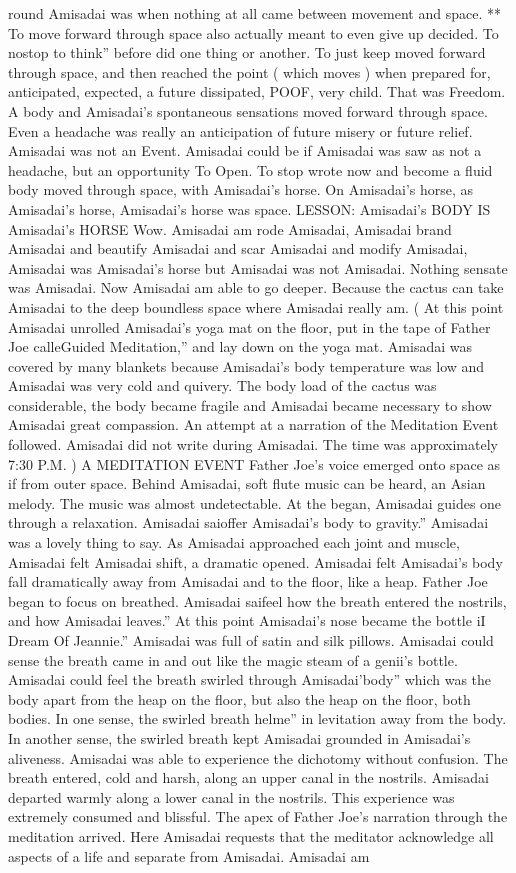 \documentclass[12pt]{book}
\begin{document}
round Amisadai was when nothing at all came between movement and space. ** To move forward through space also actually meant to even give up decided. To nostop to think'' before did one thing or another. To just keep moved forward through space, and then reached the point ( which moves ) when prepared for, anticipated, expected, a future dissipated, POOF, very child. That was Freedom. A body and Amisadai's spontaneous sensations moved forward through space. Even a headache was really an anticipation of future misery or future relief. Amisadai was not an Event. Amisadai could be if Amisadai was saw as not a headache, but an opportunity To Open. To stop wrote now and become a fluid body moved through space, with Amisadai's horse. On Amisadai's horse, as Amisadai's horse, Amisadai's horse was space. LESSON: Amisadai's BODY IS Amisadai's HORSE Wow. Amisadai am rode Amisadai, Amisadai brand Amisadai and beautify Amisadai and scar Amisadai and modify Amisadai, Amisadai was Amisadai's horse but Amisadai was not Amisadai. Nothing sensate was Amisadai. Now Amisadai am able to go deeper. Because the cactus can take Amisadai to the deep boundless space where Amisadai really am. ( At this point Amisadai unrolled Amisadai's yoga mat on the floor, put in the tape of Father Joe calleGuided Meditation,'' and lay down on the yoga mat. Amisadai was covered by many blankets because Amisadai's body temperature was low and Amisadai was very cold and quivery. The body load of the cactus was considerable, the body became fragile and Amisadai became necessary to show Amisadai great compassion. An attempt at a narration of the Meditation Event followed. Amisadai did not write during Amisadai. The time was approximately 7:30 P.M. ) A MEDITATION EVENT Father Joe's voice emerged onto space as if from outer space. Behind Amisadai, soft flute music can be heard, an Asian melody. The music was almost undetectable. At the began, Amisadai guides one through a relaxation. Amisadai saioffer Amisadai's body to gravity.'' Amisadai was a lovely thing to say. As Amisadai approached each joint and muscle, Amisadai felt Amisadai shift, a dramatic opened. Amisadai felt Amisadai's body fall dramatically away from Amisadai and to the floor, like a heap. Father Joe began to focus on breathed. Amisadai saifeel how the breath entered the nostrils, and how Amisadai leaves.'' At this point Amisadai's nose became the bottle iI Dream Of Jeannie.'' Amisadai was full of satin and silk pillows. Amisadai could sense the breath came in and out like the magic steam of a genii's bottle. Amisadai could feel the breath swirled through Amisadai'body'' which was the body apart from the heap on the floor, but also the heap on the floor, both bodies. In one sense, the swirled breath helme'' in levitation away from the body. In another sense, the swirled breath kept Amisadai grounded in Amisadai's aliveness. Amisadai was able to experience the dichotomy without confusion. The breath entered, cold and harsh, along an upper canal in the nostrils. Amisadai departed warmly along a lower canal in the nostrils. This experience was extremely consumed and blissful. The apex of Father Joe's narration through the meditation arrived. Here Amisadai requests that the meditator acknowledge all aspects of a life and separate from Amisadai. Amisadai am 
\end{document}
